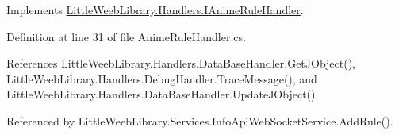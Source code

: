 Implements \mbox{\hyperlink{interface_little_weeb_library_1_1_handlers_1_1_i_anime_rule_handler_ae8bcf661c81733b24b52ce3e180aeac1}{Little\+Weeb\+Library.\+Handlers.\+I\+Anime\+Rule\+Handler}}.



Definition at line 31 of file Anime\+Rule\+Handler.\+cs.



References Little\+Weeb\+Library.\+Handlers.\+Data\+Base\+Handler.\+Get\+J\+Object(), Little\+Weeb\+Library.\+Handlers.\+Debug\+Handler.\+Trace\+Message(), and Little\+Weeb\+Library.\+Handlers.\+Data\+Base\+Handler.\+Update\+J\+Object().



Referenced by Little\+Weeb\+Library.\+Services.\+Info\+Api\+Web\+Socket\+Service.\+Add\+Rule().


